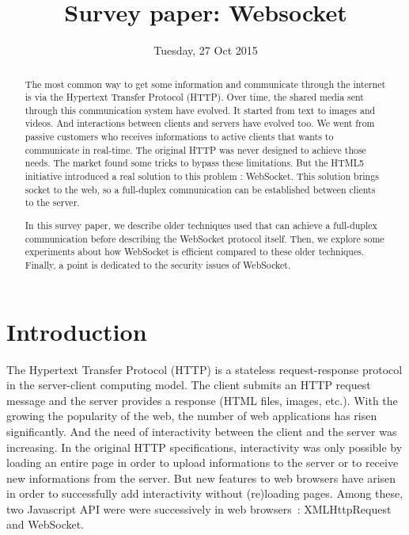 \documentclass[journal,compsoc]{IEEEtran}
\newcommand{\ws}{WebSocket}
\begin{document}
\author{}

\title{Survey paper: Websocket}

\date{Tuesday, 27 Oct 2015}

\maketitle
\IEEEpeerreviewmaketitle



\begin{abstract}
The most common way to get some information and communicate through the internet is via the Hypertext Transfer Protocol (HTTP).
Over time, the shared media sent through this communication system have evolved.
It started from text to images and videos.
And interactions between clients and servers have evolved too.
We went from passive customers who receives informations to active clients that wants to communicate in real-time.
The original HTTP was never designed to achieve those needs.
The market found some tricks to bypass these limitations.
But the HTML5 initiative introduced a real solution to this problem : \ws{}.
This solution brings socket to the web, so a full-duplex communication can be established between clients to the server.

In this survey paper, we describe older techniques used that can achieve a full-duplex communication before describing the \ws{} protocol itself.
Then, we explore some experiments about how \ws{} is efficient compared to these older techniques.
Finally, a point is dedicated to the security issues of \ws.
\end{abstract}


\section{Introduction}

The Hypertext Transfer Protocol (HTTP) is a stateless request-response protocol in the server-client computing model.
The client submits an HTTP request message and the server provides a response (HTML files, images, etc.).
With the growing the popularity of the web, the number of web applications has risen significantly.
And the need of interactivity between the client and the server was increasing.
In the original HTTP specifications, interactivity was only possible by loading an entire page in order to upload informations to the server or to receive new informations from the server.
But new features to web browsers have arisen in order to successfully add interactivity without (re)loading pages.
Among these, two Javascript API were were successively in web \mbox{browsers :} XMLHttpRequest and \ws.
\end{document}
